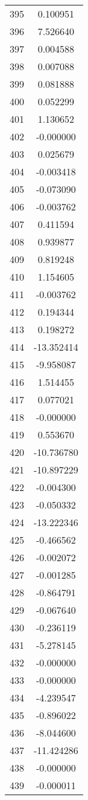 \documentclass[12pt]{article}
\begin{document}
\begin{longtable}{@{}cc@{}}
395 & 0.100951 \\
396 & 7.526640 \\
397 & 0.004588 \\
398 & 0.007088 \\
399 & 0.081888 \\
400 & 0.052299 \\
401 & 1.130652 \\
402 & -0.000000 \\
403 & 0.025679 \\
404 & -0.003418 \\
405 & -0.073090 \\
406 & -0.003762 \\
407 & 0.411594 \\
408 & 0.939877 \\
409 & 0.819248 \\
410 & 1.154605 \\
411 & -0.003762 \\
412 & 0.194344 \\
413 & 0.198272 \\
414 & -13.352414 \\
415 & -9.958087 \\
416 & 1.514455 \\
417 & 0.077021 \\
418 & -0.000000 \\
419 & 0.553670 \\
420 & -10.736780 \\
421 & -10.897229 \\
422 & -0.004300 \\
423 & -0.050332 \\
424 & -13.222346 \\
425 & -0.466562 \\
426 & -0.002072 \\
427 & -0.001285 \\
428 & -0.864791 \\
429 & -0.067640 \\
430 & -0.236119 \\
431 & -5.278145 \\
432 & -0.000000 \\
433 & -0.000000 \\
434 & -4.239547 \\
435 & -0.896022 \\
436 & -8.044600 \\
437 & -11.424286 \\
438 & -0.000000 \\
439 & -0.000011 \\

\end{longtable}
\end{document}
